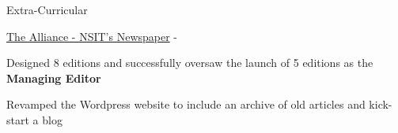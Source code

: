 \documentclass[../resume.tex]{subfiles}
\begin{document}

\begin{rSection}{Extra-Curricular} \itemsep -3pt

    \begin{rSubsection}
        {\href{https://go.rohit.page/alliance}{The Alliance - NSIT's Newspaper}}
        {  -  }
        {}{}

        \item Designed 8 editions and successfully oversaw the launch of 5 editions as the \textbf{Managing Editor}
        \item Revamped the Wordpress website to include an archive of old articles and kick-start a blog
    \end{rSubsection}

\end{rSection}

\end{document}
